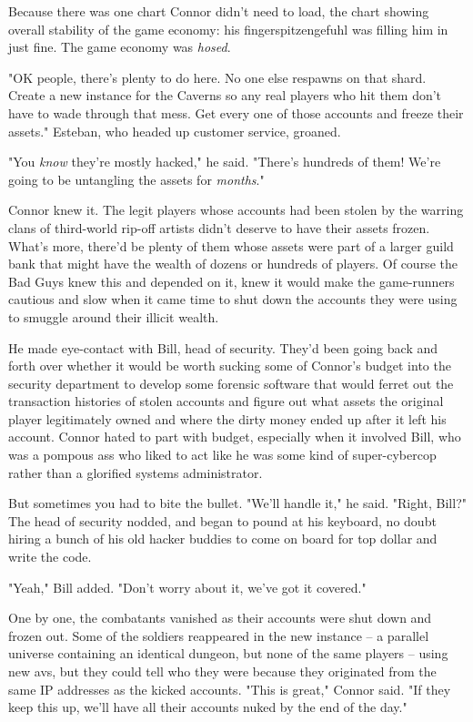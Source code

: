 Because there was one chart Connor didn't need to load, the chart
showing overall stability of the game economy: his
fingerspitzengefuhl was filling him in just fine. The game economy
was \emph{hosed}.

"OK people, there's plenty to do here. No one else respawns on that
shard. Create a new instance for the Caverns so any real players
who hit them don't have to wade through that mess. Get every one of
those accounts and freeze their assets." Esteban, who headed up
customer service, groaned.

"You \emph{know} they're mostly hacked," he said. "There's hundreds
of them! We're going to be untangling the assets for
\emph{months}."

Connor knew it. The legit players whose accounts had been stolen by
the warring clans of third-world rip-off artists didn't deserve to
have their assets frozen. What's more, there'd be plenty of them
whose assets were part of a larger guild bank that might have the
wealth of dozens or hundreds of players. Of course the Bad Guys
knew this and depended on it, knew it would make the game-runners
cautious and slow when it came time to shut down the accounts they
were using to smuggle around their illicit wealth.

He made eye-contact with Bill, head of security. They'd been going
back and forth over whether it would be worth sucking some of
Connor's budget into the security department to develop some
forensic software that would ferret out the transaction histories
of stolen accounts and figure out what assets the original player
legitimately owned and where the dirty money ended up after it left
his account. Connor hated to part with budget, especially when it
involved Bill, who was a pompous ass who liked to act like he was
some kind of super-cybercop rather than a glorified systems
administrator.

But sometimes you had to bite the bullet. "We'll handle it," he
said. "Right, Bill?" The head of security nodded, and began to
pound at his keyboard, no doubt hiring a bunch of his old hacker
buddies to come on board for top dollar and write the code.

"Yeah," Bill added. "Don't worry about it, we've got it covered."

One by one, the combatants vanished as their accounts were shut
down and frozen out. Some of the soldiers reappeared in the new
instance -- a parallel universe containing an identical dungeon,
but none of the same players -- using new avs, but they could tell
who they were because they originated from the same IP addresses as
the kicked accounts. "This is great," Connor said. "If they keep
this up, we'll have all their accounts nuked by the end of the
day."

